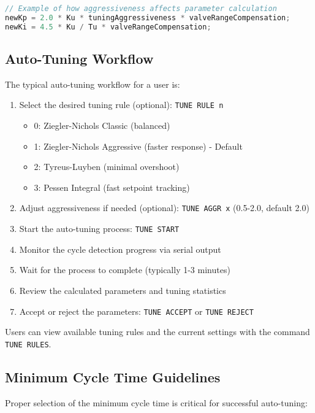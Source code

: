 \documentclass[a4paper,11pt]{article}
\begin{document}
\begin{lstlisting}[language=C++, caption=Aggressiveness Implementation]
// Example of how aggressiveness affects parameter calculation
newKp = 2.0 * Ku * tuningAggressiveness * valveRangeCompensation;
newKi = 4.5 * Ku / Tu * valveRangeCompensation;
\end{lstlisting}

\subsection{Auto-Tuning Workflow}

The typical auto-tuning workflow for a user is:

\begin{enumerate}
    \item Select the desired tuning rule (optional): \texttt{TUNE RULE n}
    \begin{itemize}
        \item 0: Ziegler-Nichols Classic (balanced)
        \item 1: Ziegler-Nichols Aggressive (faster response) - Default
        \item 2: Tyreus-Luyben (minimal overshoot)
        \item 3: Pessen Integral (fast setpoint tracking)
    \end{itemize}
    \item Adjust aggressiveness if needed (optional): \texttt{TUNE AGGR x} (0.5-2.0, default 2.0)
    \item Start the auto-tuning process: \texttt{TUNE START}
    \item Monitor the cycle detection progress via serial output
    \item Wait for the process to complete (typically 1-3 minutes)
    \item Review the calculated parameters and tuning statistics
    \item Accept or reject the parameters: \texttt{TUNE ACCEPT} or \texttt{TUNE REJECT}
\end{enumerate}

Users can view available tuning rules and the current settings with the command \texttt{TUNE RULES}.

\subsection{Minimum Cycle Time Guidelines}

Proper selection of the minimum cycle time is critical for successful auto-tuning:
\end{document}
